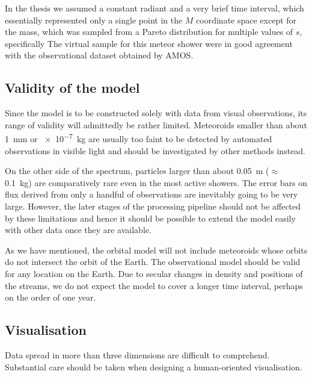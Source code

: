     In the thesis we assumed a constant radiant and a very brief time interval,
    which essentially represented only a single point in the $M$ coordinate space
    except for the mass, which was sampled from a Pareto distribution for multiple values of $s$,
    specifically
    The virtual sample for this meteor shower were in good agreement with the observational dataset
    obtained by AMOS.

    \subsection{Validity of the model} \label{iav}
        Since the model is to be constructed solely with data from visual observations,
        its range of validity will admittedly be rather limited.
        Meteoroids smaller than about \SI{1}{\milli\metre} or \SI{e-7}{\kilo\gram} are usually too faint
        to be detected by automated observations in visible light and should be investigated
        by other methods instead.

        On the other side of the spectrum, particles larger than about \SI{0.05}{\metre} ($\approx$ \SI{0.1}{\kilo\gram})
        are comparatively rare even in the most active showers.
        The error bars on flux derived from only a handful of observations are inevitably going to be very large.
        However, the later stages of the processing pipeline should not be affected by these limitations
        and hence it should be possible to extend the model easily with other data once they are available.

        As we have mentioned, the orbital model will not include meteoroids whose orbits do not
        intersect the orbit of the Earth. The observational model should be valid for any location on the Earth.
        Due to secular changes in density and positions of the streams, we do not expect the model to cover
        a longer time interval, perhaps on the order of one year.

    \subsection{Visualisation} \label{iov}
        Data spread in more than three dimensions are difficult to comprehend.
        Substantial care should be taken when designing a human-oriented visualisation.

